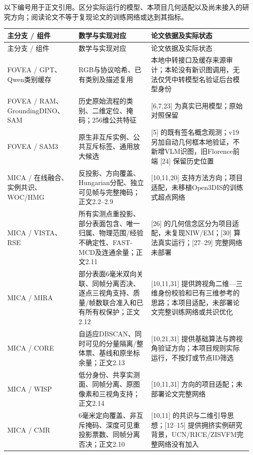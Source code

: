 \documentclass[UTF8,fontset=fandol]{ctexart}
\begin{document}
以下编号用于正文引用。区分实际运行的模型、本项目几何适配以及尚未接入的研究方向；阅读论文不等于复现论文的训练网络或达到其指标。



{\small
\begin{longtable}{|p{}|p{}|p{}|}
\hline
主分支 / 组件 & 数学与实现对应 & 论文依据及实际状态 \\ \hline
\endfirsthead
\hline
主分支 / 组件 & 数学与实现对应 & 论文依据及实际状态 \\ \hline
\endhead
FOVEA / GPT、Qwen类别缓存 & RGB与协议哈希、已有类别及描述复用 & 本地中转接口及缓存来源审计；本轮没有新识图调用，无法仅凭中转模型名验证后台模型身份 \\ \hline
FOVEA / RAM、GroundingDINO、SAM & 历史原始流程的类别、二维定位、掩码；256维公共特征 & [6,7,23] 为真实已用模型；原始对照保留 \\ \hline
FOVEA / SAM3 & 原生非互斥实例、公共互斥标签、通用放大候选 & [5] 的既有签名概念观测；v19另加自动几何框本地验证，不新增VLM识图，旧Florence前端 [24] 保留历史位置 \\ \hline
MICA / 在线融合、实例共识、WOC/HMG & 反投影、方向覆盖、Hungarian分配、独立可见帧与完整掩码；正文2.2–2.9 & [10,11,20] 支持方法方向；项目适配，未移植Open3DIS的训练式超点网络 \\ \hline
MICA / VISTA、RSE & 所有实测点重投影、部分表面包含、唯一归属、物理范围/经验不确定性、FAST-MCD及连通余量；正文2.11 & [26] 的几何信念区分为项目适配，未复现NIW/EM；[30] 算法真实运行；[27–29] 完整网络未部署 \\ \hline
MICA / MIRA & 部分表面6毫米双向关联、同帧分离否决、逐点三视角支持、质量/帧数联合准入和已有所有权保护；正文2.12 & [10,11,31] 提供跨视角二维—三维身份校验和已有三维参考的思路；本项目适配，未部署论文完整训练网络或共识优化 \\ \hline
MICA / CORE & 自适应DBSCAN、同时可见的分量隔离/整体票、基线和原坐标余量；正文2.13 & [10,21,31] 提供基础算法与跨视角验证方向；本项目规则实际运行，不按灯或节点ID筛选 \\ \hline
MICA / WISP & 低分身份、共享实测面、同帧分离、原图像素和三视角支持；正文2.14 & [10,11,31] 方向的项目适配；未部署论文完整网络 \\ \hline
MICA / CMR & 6毫米定向覆盖、非互斥掩码、深度可见重投影票数、同帧分离否决；正文2.10 & [10,11] 的共识与二维引导思想；[12–15] 提供拥挤实例研究背景，UCN/RICE/ZISVFM完整网络没有加入 \\ \hline

\end{longtable}}
\end{document}

